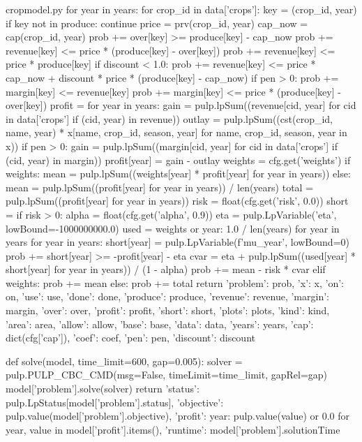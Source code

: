 \documentclass[bwprint]{gmcmthesis}
\begin{document}
\begin{appendices}
\begin{Python}{cropmodel.py}
    for year in years:
        for crop_id in data['crops']:
            key = (crop_id, year)
            if key not in produce:
                continue
            price = prv(crop_id, year)
            cap_now = cap(crop_id, year)
            prob += over[key] >= produce[key] - cap_now
            prob += revenue[key] <= price * (produce[key] - over[key])
            prob += revenue[key] <= price * produce[key]
            if discount < 1.0:
                prob += revenue[key] <= price * cap_now + discount * price * (produce[key] - cap_now)
            if pen > 0:
                prob += margin[key] <= revenue[key]
                prob += margin[key] <= price * (produce[key] - over[key])
    profit = {}
    for year in years:
        gain = pulp.lpSum((revenue[cid, year] for cid in data['crops'] if (cid, year) in revenue))
        outlay = pulp.lpSum((cst(crop_id, name, year) * x[name, crop_id, season, year] for name, crop_id, season, year in x))
        if pen > 0:
            gain = pulp.lpSum((margin[cid, year] for cid in data['crops'] if (cid, year) in margin))
        profit[year] = gain - outlay
    weights = cfg.get('weights')
    if weights:
        mean = pulp.lpSum((weights[year] * profit[year] for year in years))
    else:
        mean = pulp.lpSum((profit[year] for year in years)) / len(years)
    total = pulp.lpSum((profit[year] for year in years))
    risk = float(cfg.get('risk', 0.0))
    short = {}
    if risk > 0:
        alpha = float(cfg.get('alpha', 0.9))
        eta = pulp.LpVariable('eta', lowBound=-1000000000.0)
        used = weights or {year: 1.0 / len(years) for year in years}
        for year in years:
            short[year] = pulp.LpVariable(f'mu_{year}', lowBound=0)
            prob += short[year] >= -profit[year] - eta
        cvar = eta + pulp.lpSum((used[year] * short[year] for year in years)) / (1 - alpha)
        prob += mean - risk * cvar
    elif weights:
        prob += mean
    else:
        prob += total
    return {'problem': prob, 'x': x, 'on': on, 'use': use, 'done': done, 'produce': produce, 'revenue': revenue, 'margin': margin, 'over': over, 'profit': profit, 'short': short, 'plots': plots, 'kind': kind, 'area': area, 'allow': allow, 'base': base, 'data': data, 'years': years, 'cap': dict(cfg['cap']), 'coef': coef, 'pen': pen, 'discount': discount}

def solve(model, time_limit=600, gap=0.005):
    solver = pulp.PULP_CBC_CMD(msg=False, timeLimit=time_limit, gapRel=gap)
    model['problem'].solve(solver)
    return {'status': pulp.LpStatus[model['problem'].status], 'objective': pulp.value(model['problem'].objective), 'profit': {year: pulp.value(value) or 0.0 for year, value in model['profit'].items()}, 'runtime': model['problem'].solutionTime}


\end{Python}
\end{appendices}
\end{document}
